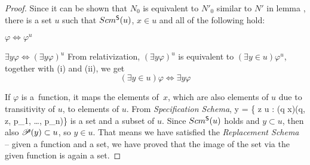 \begin{proof}
Since it can be shown that $N_0$ is equivalent to $N'_0$ similar to $N'$ in lemma , 
there is a set $u$ such that $Scm^{\sf{S}}(u)$, $x \in u$ and all of the following hold:
\bce[(i)]
\item $\varphi \iff \varphi^{u}$
\item $\exists y \varphi \iff (\exists y \varphi)^{u}$
\ece
From relativization, $(\exists y \varphi)^{u}$ is equivalent to $(\exists y \in u) \varphi^{u}$, together with (i) and (ii), we get
\begin{equation}
(\exists y \in u)\varphi \iff \exists y \varphi
\end{equation}

If $\varphi$ is a~function, %
it maps the elements of~$x$, which are also elements of $u$ due to transitivity of $u$, to elements of $u$. 
From \emph{Specification Schema},
\beq
y = \{ z \in u : (\exists q \in x)\varphi(q, z, p_1, \ldots, p_n)\}
\eeq
is a set and a subset of $u$. 
Since $Scm^{\sf{S}}(u)$ holds and $y \subset u$, then also $\mathscr{P} (y) \subset u$, so $y \in u$.
That means we have satisfied the \emph{Replacement Schema} – given a function and a set, we have proved that the image of the set via the given function is again a set.
\end{proof} 


